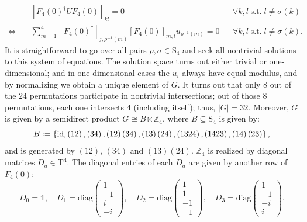 \documentclass[referee,sn-mathphys-num]{sn-jnl}%
\theoremstyle{thmstyleone}%
\theoremstyle{thmstyletwo}%
\theoremstyle{remark}
\theoremstyle{thmstylethree}%
\newcommand{\abs}[1]{\left\vert#1\right\vert}
\newcommand{\defeq}{\vcentcolon=}
\begin{document}
\begin{align}
		& \left[ F_4 \left( 0 \right)^\dagger U F_4 \left( 0 \right) \right]_{kl} = 0 && \forall k, l \; \mathrm{s.t.} \; l \neq \sigma \left( k \right) \nonumber\\
		\Leftrightarrow \quad & \sum_{m=1}^{4} \left[ F_4 \left( 0 \right)^\dagger \right]_{j, \rho^{-1} \left( m \right)} \left[  F_4 \left( 0 \right) \right]_{m,l} u_{\rho^{-1} \left( m \right)} = 0 && \forall k, l \; \mathrm{s.t.} \; l \neq \sigma \left( k \right) .
\end{align}
It is straightforward to go over all pairs $ \rho, \sigma \in \mathrm{S}_4 $ and seek all nontrivial solutions to this system of equations. The solution space turns out either trivial or one-dimensional; and in one-dimensional cases the $u_i$ always have equal modulus, and by normalizing we obtain a unique element of $G$.
It turns out that only $8$ out of the $24$ permutations participate in nontrivial intersections; out of those $8$ permutations, each one intersects $4$ (including itself); thus, $\abs{G} = 32$. Moreover, $G$ is given by a semidirect product $ G \cong B \ltimes \mathbb{Z}_4 $, where $ B \subseteq \mathrm{S}_4 $ is given by:
\begin{equation}
	B \defeq \left\{ \mathrm{id}, \left( 12 \right), \left( 3 4 \right), \left( 1 2 \right) \left( 3 4 \right) , \left( 1 3 \right) \left( 2 4 \right) , \left( 1 3 2 4 \right) , \left( 1 4 2 3 \right) , \left( 1 4 \right) \left( 2 3 \right) \right\} ,
\end{equation}
and is generated by $\left( 1 2 \right)$, $ \left( 3 4 \right) $ and $ \left( 1 3 \right) \left( 2 4 \right) $. $ \mathbb{Z}_4 $ is realized by diagonal matrices $ D_a \in \mathrm{T}^4 $. The diagonal entries of each $D_a$ are given by another row of $ F_4 \left( 0 \right) $:
\begin{equation}
	D_0 = \mathds{1} , \quad D_1 = \mathrm{diag} \begin{pmatrix}
		1 \\ -1 \\ i \\ -i
	\end{pmatrix} , \quad  D_2 = \mathrm{diag} \begin{pmatrix}
		1 \\ 1 \\ -1 \\ -1
	\end{pmatrix} , \quad
	D_3 = \mathrm{diag} \begin{pmatrix}
	1 \\ -1 \\ -i \\ i
\end{pmatrix} .
\end{equation}
\end{document}
